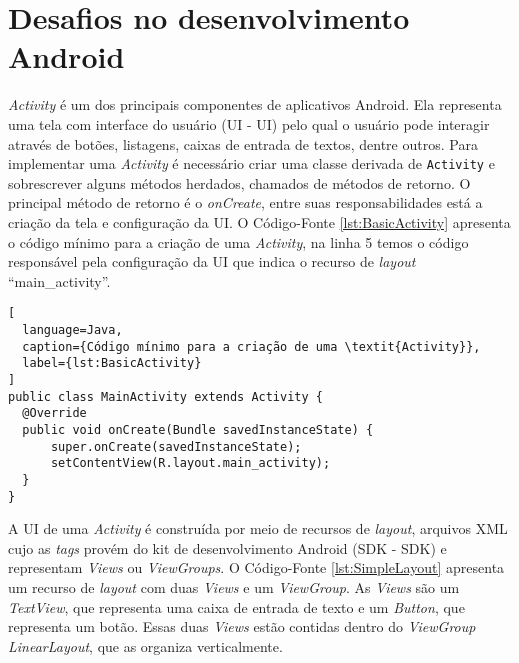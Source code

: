 \section{Desafios no desenvolvimento Android}


\textit{Activity} é um dos principais componentes de aplicativos Android. Ela representa uma tela com interface do usuário (\acl{UI} - \acs{UI}) pelo qual o usuário pode interagir através de botões, listagens, caixas de entrada de textos, dentre outros. Para implementar uma \textit{Activity} é necessário criar uma classe derivada de \texttt{Activity} e sobrescrever alguns métodos herdados, chamados de métodos de retorno. O principal método de retorno é o \textit{onCreate}, entre suas responsabilidades está a criação da tela e configuração da \acs{UI}. O Código-Fonte \ref{lst:BasicActivity} apresenta o código mínimo para a criação de uma \textit{Activity}, na linha 5 temos o código responsável pela configuração da \acs{UI} que indica o recurso de \textit{layout} ``main\_activity''.

\begin{lstlisting}[
  language=Java, 
  caption={Código mínimo para a criação de uma \textit{Activity}}, 
  label={lst:BasicActivity}
]
public class MainActivity extends Activity {
  @Override
  public void onCreate(Bundle savedInstanceState) {
      super.onCreate(savedInstanceState);
      setContentView(R.layout.main_activity);
  }
}
\end{lstlisting}

A \acs{UI} de uma \textit{Activity} é construída por meio de recursos de \textit{layout}, arquivos XML cujo as \textit{tags} provém do kit de desenvolvimento Android (\acl{SDK} - \acs{SDK}) e representam \textit{Views} ou \textit{ViewGroups}. O Código-Fonte \ref{lst:SimpleLayout} apresenta um recurso de \textit{layout} com duas \textit{Views} e um \textit{ViewGroup}. As \textit{Views} são um \textit{TextView}, que representa uma caixa de entrada de texto e um \textit{Button}, que representa um botão. Essas duas \textit{Views} estão contidas dentro do \textit{ViewGroup} \textit{LinearLayout}, que as organiza verticalmente. 


